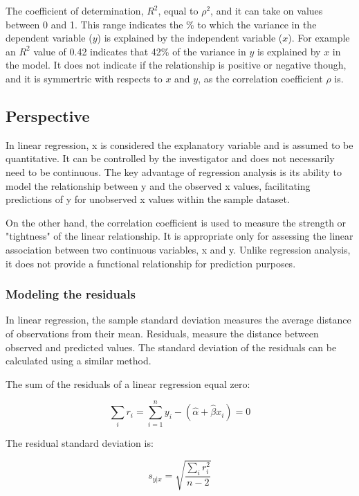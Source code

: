 \documentclass{article}
\begin{document}
The coefficient of determination, $R^2$, equal to $\rho ^2$, and it can take on values between 0 and 1. This range indicates the \% to which the variance in the dependent variable ($y$) is explained by the independent variable ($x$). For example an $R^2$ value of 0.42 indicates that 42\% of the variance in $y$ is explained by $x$ in the model. It does not indicate if the relationship is positive or negative though, and it is symmertric with respects to $x$ and $y$, as the correlation coefficient $\rho$ is.

\subsection{Perspective}

In linear regression, x is considered the explanatory variable and is assumed to be quantitative. It can be controlled by the investigator and does not necessarily need to be continuous. The key advantage of regression analysis is its ability to model the relationship between y and the observed x values, facilitating predictions of y for unobserved x values within the sample dataset.

On the other hand, the correlation coefficient is used to measure the strength or "tightness" of the linear relationship. It is appropriate only for assessing the linear association between two continuous variables, x and y. Unlike regression analysis, it does not provide a functional relationship for prediction purposes.

\subsubsection{Modeling the residuals}

In linear regression, the sample standard deviation measures the average distance of observations from their mean. 
Residuals, measure the distance between observed and predicted values. The standard deviation of the residuals can be calculated using a similar method. 

The sum of the residuals of a linear regression equal zero:

\begin{equation*}
\sum\limits_{i} {r_i} = \sum_{i=1}^n {y_i-(\hat \alpha + \hat \beta x_i)}=0\end{equation*}

The residual standard deviation is:

\begin{equation*}
s_{y|x}=\sqrt{\frac {\sum\limits_{i} {r_i^2}} {n-2}}
\end{equation*}
\end{document}
